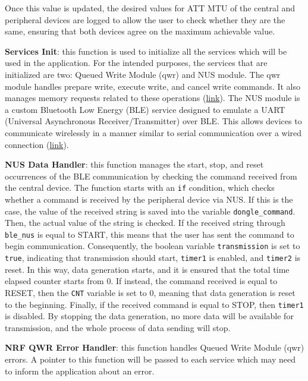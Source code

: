 \documentclass{Configuration_Files/PoliMi3i_thesis}
\begin{document}
Once this value is updated, the desired values for ATT MTU of the central and peripheral devices are logged to allow the user to check whether they are the same, ensuring that both devices agree on the maximum achievable value.

\textbf{Services Init}: this function is used to initialize all the services which will be used in the application. For the intended purposes, the services that are initialized are two: Queued Write Module (qwr) and NUS module. The qwr module handles prepare write, execute write, and cancel write commands. It also manages memory requests related to these operations (\href{https://infocenter.nordicsemi.com/index.jsp?topic=%2Fcom.nordic.infocenter.sdk5.v15.0.0%2Fgroup__nrf__ble__qwr.html}{link}). The NUS module is a custom Bluetooth Low Energy (BLE) service designed to emulate a UART (Universal Asynchronous Receiver/Transmitter) over BLE. This allows devices to communicate wirelessly in a manner similar to serial communication over a wired connection (\href{https://infocenter.nordicsemi.com/index.jsp?topic=%2Fcom.nordic.infocenter.sdk5.v15.0.0%2Fgroup__ble__nus__c.html}{link}).

\textbf{NUS Data Handler}: this function manages the start, stop, and reset occurrences of the BLE communication by checking the command received from the central device. The function starts with an \texttt{if} condition, which checks whether a command is received by the peripheral device via NUS. If this is the case, the value of the received string is saved into the variable \texttt{dongle\_command}. Then, the actual value of the string is checked. If the received string through \texttt{ble\_nus} is equal to START, this means that the user has sent the command to begin communication. Consequently, the boolean variable \texttt{transmission} is set to \texttt{true}, indicating that transmission should start, \texttt{timer1} is enabled, and \texttt{timer2} is reset. In this way, data generation starts, and it is ensured that the total time elapsed counter starts from 0. If instead, the command received is equal to RESET, then the \texttt{CNT} variable is set to 0, meaning that data generation is reset to the beginning. Finally, if the received command is equal to STOP, then \texttt{timer1} is disabled. By stopping the data generation, no more data will be available for transmission, and the whole process of data sending will stop.


\textbf{NRF QWR Error Handler}: this function handles Queued Write Module (qwr) errors. A pointer to this function will be passed to each service which may need to inform the application about an error.
\end{document}

